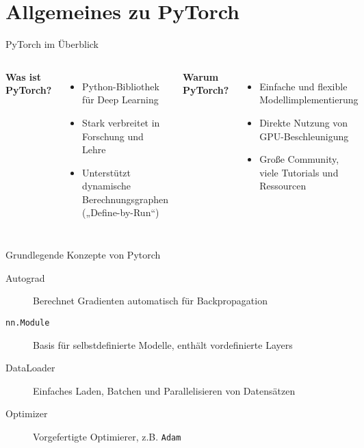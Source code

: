 \section{Allgemeines zu PyTorch}


\begin{frame}{PyTorch im Überblick}
    \begin{columns}[T,onlytextwidth]
        \textbf{Was ist PyTorch?}
        \begin{itemize}
            \item Python-Bibliothek für Deep Learning
            \item Stark verbreitet in Forschung und Lehre \cite{bauer}
            \item Unterstützt dynamische Berechnungsgraphen („Define-by-Run“)
        \end{itemize}

        \textbf{Warum PyTorch?}
        \begin{itemize}
            \item Einfache und flexible Modellimplementierung
            \item Direkte Nutzung von GPU-Beschleunigung
            \item Große Community, viele Tutorials und Ressourcen
        \end{itemize}
    \end{columns}
\end{frame}


\begin{frame}{Grundlegende Konzepte von Pytorch}
    \begin{description}
        \item[Autograd] Berechnet Gradienten automatisch für Backpropagation
        \item[\texttt{nn.Module}] Basis für selbstdefinierte Modelle, enthält vordefinierte Layers
        \item[DataLoader] Einfaches Laden, Batchen und \alert{Parallelisieren} von Datensätzen
        \item[Optimizer] Vorgefertigte Optimierer, z.B. \texttt{Adam}
    \end{description}
\end{frame}